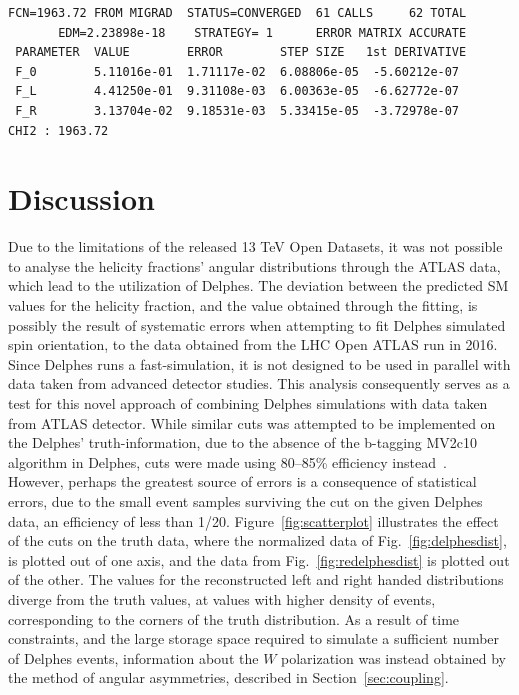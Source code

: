 \documentclass[12pt,a4paper]{article}
\numberwithin{equation}{section}
\begin{document}
\begin{verbatim}
FCN=1963.72 FROM MIGRAD  STATUS=CONVERGED  61 CALLS     62 TOTAL
       EDM=2.23898e-18    STRATEGY= 1      ERROR MATRIX ACCURATE
 PARAMETER  VALUE        ERROR        STEP SIZE   1st DERIVATIVE
 F_0        5.11016e-01  1.71117e-02  6.08806e-05  -5.60212e-07
 F_L        4.41250e-01  9.31108e-03  6.00363e-05  -6.62772e-07
 F_R        3.13704e-02  9.18531e-03  5.33415e-05  -3.72978e-07
CHI2 : 1963.72
\end{verbatim}


\section{Discussion}
Due to the limitations of the released 13 TeV Open Datasets, it was not possible
to analyse the helicity fractions' angular distributions through the ATLAS data,
which lead to the utilization of Delphes. The deviation between the predicted SM
values for the helicity fraction, and the value obtained through the fitting, is
possibly the result of systematic errors when attempting to fit Delphes
simulated spin orientation, to the data obtained from the LHC Open ATLAS run in
2016. Since Delphes runs a fast-simulation, it is not designed to be used in
parallel with data taken from advanced detector studies. This analysis
consequently serves as a test for this novel approach of combining Delphes
simulations with data taken from ATLAS detector. While similar cuts was
attempted to be implemented on the Delphes' truth-information, due to the
absence of the b-tagging MV2c10 algorithm in Delphes, cuts were made using
80--85\% efficiency instead~\cite{CMS-PAS-BTV-11-004}.\\

However, perhaps the greatest source of errors is a consequence of statistical
errors, due to the small event samples surviving the cut on the given Delphes
data, an efficiency of less than 1/20. Figure~\ref{fig:scatterplot} illustrates
the effect of the cuts on the truth data, where the normalized data of
Fig.~\ref{fig:delphesdist}, is plotted out of one axis, and the data from
Fig.~\ref{fig:redelphesdist} is plotted out of the other. The values for the
reconstructed left and right handed distributions diverge from the truth values,
at values with higher density of events, corresponding to the corners of the
truth distribution. As a result of time constraints, and the large storage space
required to simulate a sufficient number of Delphes events, information about
the $W$ polarization was instead obtained by the method of angular asymmetries,
described in Section~\ref{sec:coupling}.\\
\end{document}
